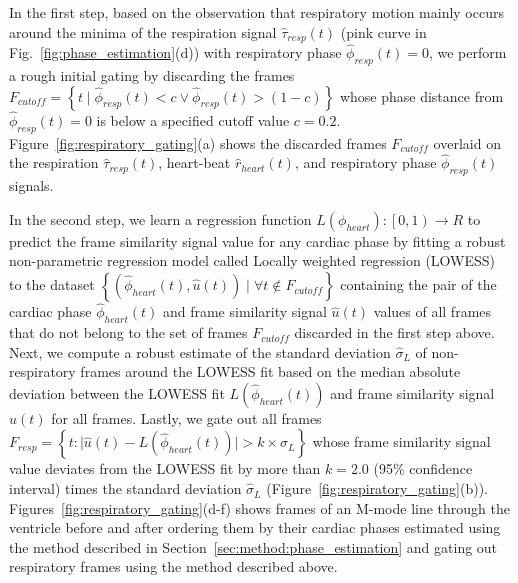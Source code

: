 \documentclass[journal]{IEEEtran}
\begin{document}
	In the first step, based on the observation that respiratory motion mainly occurs around the minima of the respiration signal $\hat{\tau}_{resp}(t)$ (pink curve in Fig.~\ref{fig:phase_estimation}(d)) with respiratory phase $\hat{\phi}_{resp}(t) = 0$, we perform a rough initial gating by discarding the frames $F_{cutoff} = \left \{ t \mid \hat{\phi}_{resp}(t) < c \vee \hat{\phi}_{resp}(t) > (1 - c) \right \}$ whose phase distance from $\hat{\phi}_{resp}(t) = 0$ is below a specified cutoff value $c=0.2$. Figure~\ref{fig:respiratory_gating}(a) shows the discarded frames $F_{cutoff}$ overlaid on the respiration $\hat{\tau}_{resp}(t)$, heart-beat  $\hat{r}_{heart}(t)$, and respiratory phase $\hat{\phi}_{resp}(t)$ signals.

	In the second step, we learn a regression function $L(\phi_{heart}) : \left [  0, 1\right ) \to R$ to predict the frame similarity signal value for any cardiac phase by fitting a robust non-parametric regression model called Locally weighted regression (LOWESS)~\cite{Cleveland1988} to the dataset $\left \{ \left(\hat{\phi}_{heart}(t), \hat{u}(t) \right) \mid \forall t \notin F_{cutoff}  \right \}$ containing the pair of the cardiac phase $\hat{\phi}_{heart}(t)$ and frame similarity signal $\hat{u}(t)$  values of all frames that do not belong to the set of frames $F_{cutoff}$ discarded in the first step above. Next, we compute a robust estimate of the standard deviation $\hat{\sigma}_{L}$ of non-respiratory frames around the LOWESS fit based on the median absolute deviation between the LOWESS fit $L( \hat{\phi}_{heart}(t) )$ and frame similarity signal $\hat{u}(t)$ for all frames. Lastly, we gate out all frames $F_{resp} = \left \{ t : \lvert \hat{u}(t) - L( \hat{\phi}_{heart}(t) ) \rvert   > k \times \hat{\sigma}_{L}  \right \}$
whose frame similarity signal value deviates from the LOWESS fit by more than $k = 2.0$ (95\% confidence interval) times the standard deviation $\hat{\sigma}_{L}$ (Figure~\ref{fig:respiratory_gating}(b)). Figures~\ref{fig:respiratory_gating}(d-f) shows frames of an M-mode line through the ventricle before and after ordering them by their cardiac phases estimated using the method described in Section~\ref{sec:method:phase_estimation} and gating out respiratory frames using the method described above. 	
%
\end{document}
